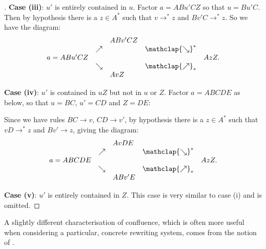 \documentclass[noindex,noinsetproof,emphthm,12pt]{lmaths}
\newcommand{\nearrowstar}{\mathclap{\nearrow}_{*}}
\newcommand{\searrowstar}{\mathclap{\searrow}^{*}}
\begin{document}
\begin{proof}[ ]
	\textbf{Case (iii)}: $u'$ is entirely contained in $u$. Factor $a = ABu'CZ$ so that $u = Bu'C$. Then by hypothesis there is a $z \in A^*$ such that $v \to^* z$ and $Bv'C \to^* z$. So we have the diagram: \[
		\begin{array}{lllll}
			& & ABv'CZ & & \\
			& \nearrow & & \searrowstar & \\
			a = ABu'CZ & & & & AzZ. \\
			& \searrow & & \nearrowstar & \\
			& & AvZ & &
		\end{array}
	\]

	\textbf{Case (iv)}: $u'$ is contained in $uZ$ but not in $u$ or $Z$. Factor $a = ABCDE$ as below, so that $u = BC$, $u' = CD$ and $Z = DE$:

	{\centering
	\par}

	Since we have rules $BC \to v$, $CD \to v'$, by hypothesis there is a $z \in A^*$ such that $vD \to^* z$ and $Bv' \to z$, giving the diagram: \[
		\begin{array}{lllll}
			& & AvDE & & \\
			& \nearrow & & \searrowstar & \\
			a = ABCDE & & & & AzZ. \\
			& \searrow & & \nearrowstar & \\
			& & ABv'E & &
		\end{array}
	\]

	\textbf{Case (v)}: $u'$ is entirely contained in $Z$. This case is very similar to case (i) and is omitted.
\end{proof}

A slightly different characterisation of confluence, which is often more useful when considering a particular, concrete rewriting system, comes from the notion of .
\end{document}

